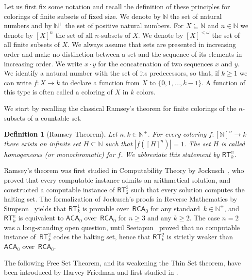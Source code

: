 \documentclass[10pt,a4paper]{article}
\newcommand{\RCA}[0]{\mathsf{RCA}}
\newcommand{\ACA}[0]{\mathsf{ACA}}
\newcommand{\RT}[0]{\mathsf{RT}}
\newcommand{\NN}[0]{\mathbb{N}}
\numberwithin{theorem}{section}
\newtheorem{definition}[theorem]{Definition}
\begin{document}
Let us first fix some notation and recall the definition of these principles for colorings of finite subsets of fixed size. We denote by $\NN$ the set of natural numbers and by $\NN^+$ the set of positive natural numbers. For $X\subseteq \NN$ and $n \in \NN$
we denote by $[X]^{n}$ the set of all $n$-subsets of $X$. We denote by $[X]^{<\omega}$ the set of all finite subsets of $X$. We always assume that sets are presented in increasing order and make no distinction between a set and the sequence of its elements in increasing order. We write $x \cdot y$ for the concatenation of two sequences $x$ and $y$. We identify a natural number with the set of its predecessors, so that, if $k\geq 1$ we can write $f: X \to k$ to declare a function from $X$ to $\{0, 1, \dots, k-1\}$. A function of this type is often called a coloring of $X$ in $k$ colors.

We start by recalling the classical Ramsey's theorem for finite colorings of the $n$-subsets of a countable set. 

\begin{definition}[Ramsey Theorem] Let $n, k\in \NN^+$.  
For every coloring $f:[\NN]^{n} \to k$ there exists an infinite set $H\subseteq \NN$ such that $|f([H]^n)| = 1$. The set $H$ is called homogeneous (or monochromatic) for $f$.
We abbreviate this statement by $\RT^n_k$.
\end{definition}

Ramsey's theorem was first studied in Computability Theory by Jockusch~\cite{JockuschRamsey_1972}, who proved that every computable instance admits an arithmetical solution, and constructed a computable instance of $\RT^3_2$ such that every solution computes the halting set. The formalization of Jockusch's proofs in Reverse Mathematics by Simpson~\cite{SIM:SOSOA} yields that $\RT^1_k$ is provable over~$\RCA_0$ for any standard~$k \in \NN^+$, and $\RT^n_k$ is equivalent to $\ACA_0$ over~$\RCA_0$ for $n \geq 3$ and any $k\geq 2$. The case $n = 2$ was a long-standing open question, until Seetapun~\cite{seetapun1995strength} proved that no computable instance of~$\RT^2_k$ codes the halting set, hence that $\RT^2_k$ is strictly weaker than $\ACA_0$ over~$\RCA_0$.

The following Free Set Theorem, and its weakening the Thin Set theorem, have been introduced by Harvey Friedman \cite{Fri-Sim:00} and first studied in \cite{Cholak_Giusto_Hirst_Jockusch_2005}.
\end{document}
